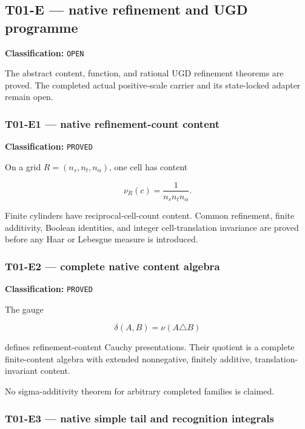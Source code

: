 \hypertarget{t01-e-native-refinement-and-ugd-programme}{%
\subsection{T01-E --- native refinement and UGD programme}\label{t01-e-native-refinement-and-ugd-programme}}

\textbf{Classification:} \texttt{OPEN}

The abstract content, function, and rational UGD refinement theorems are proved.
The completed actual positive-scale carrier and its state-locked adapter remain
open.

\hypertarget{t01-e1-native-refinement-count-content}{%
\subsubsection{T01-E1 --- native refinement-count content}\label{t01-e1-native-refinement-count-content}}

\textbf{Classification:} \texttt{PROVED}

On a grid \(R=(n_s,n_t,n_\alpha)\), one cell has content

\[
\nu_R(c)=\frac{1}{n_sn_tn_\alpha}.
\]

Finite cylinders have reciprocal-cell-count content. Common refinement, finite
additivity, Boolean identities, and integer cell-translation invariance are
proved before any Haar or Lebesgue measure is introduced.

\hypertarget{t01-e2-complete-native-content-algebra}{%
\subsubsection{T01-E2 --- complete native content algebra}\label{t01-e2-complete-native-content-algebra}}

\textbf{Classification:} \texttt{PROVED}

The gauge

\[
\delta(A,B)=\nu(A\triangle B)
\]

defines refinement-content Cauchy presentations. Their quotient is a complete
finite-content algebra with extended nonnegative, finitely additive,
translation-invariant content.

No sigma-additivity theorem for arbitrary completed families is claimed.

\hypertarget{t01-e3-native-simple-tail-and-recognition-integrals}{%
\subsubsection{T01-E3 --- native simple tail and recognition integrals}\label{t01-e3-native-simple-tail-and-recognition-integrals}}

